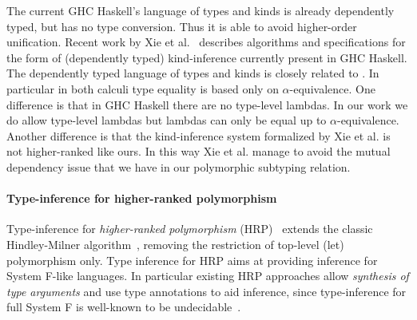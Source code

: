 The current GHC Haskell's language of types and kinds
is already dependently typed, but has no type conversion. Thus
it is able to avoid higher-order unification. Recent work by
Xie et al.~\cite{xie20kind} describes algorithms and specifications
for the form of (dependently typed) kind-inference currently present in GHC Haskell.
The dependently typed language of types and kinds is closely related
to \name. In particular in both calculi type equality is based only
on $\alpha$-equivalence. One difference is that in GHC Haskell there
are no type-level lambdas.
In our work we do allow type-level lambdas
but lambdas can only be equal up to $\alpha$-equivalence.
Another difference is that the kind-inference system formalized by Xie et al.
is not higher-ranked like ours. In this way Xie et al. manage to avoid
the mutual dependency issue that we have in our polymorphic subtyping relation.

\begin{comment}
Thus our focus is on Haskell-like languages with dependently typed
features and explicit casts, rather than languages like Agda or Idris
which typically have a conversion rule that triggers implicit type level
computation.
\end{comment}


\paragraph{Type-inference for higher-ranked polymorphism}
Type-inference for \emph{higher-ranked polymorphism}
(HRP)~\cite{dunfield2013complete,le2003ml,leijen2008hmf,vytiniotis2008fph,jones2007practical,Serrano2018, odersky1996putting}
extends the classic Hindley-Milner algorithm~\cite{hindley1969principal,milner1978theory,damas1982principal},
removing the restriction of top-level (let) polymorphism only. Type
inference for HRP aims at providing inference for System F-like
languages. In particular existing HRP approaches allow \emph{synthesis of type arguments}
and use type annotations to aid
inference, since type-inference for full System F is
well-known to be undecidable~\cite{wells1999typability}.

